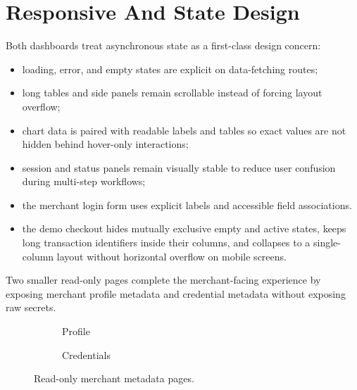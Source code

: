 \section{Responsive And State Design}

Both dashboards treat asynchronous state as a first-class design concern:

\begin{itemize}
  \item loading, error, and empty states are explicit on data-fetching routes;
  \item long tables and side panels remain scrollable instead of forcing layout
  overflow;
  \item chart data is paired with readable labels and tables so exact values are
  not hidden behind hover-only interactions;
  \item session and status panels remain visually stable to reduce user
  confusion during multi-step workflows;
  \item the merchant login form uses explicit labels and accessible field
  associations.
  \item the demo checkout hides mutually exclusive empty and active states,
  keeps long transaction identifiers inside their columns, and collapses to a
  single-column layout without horizontal overflow on mobile screens.
\end{itemize}

Two smaller read-only pages complete the merchant-facing experience by exposing
merchant profile metadata and credential metadata without exposing raw secrets.

\begin{figure}[!htbp]
\centering
\begin{subfigure}{0.48\textwidth}
  \centering
  \caption{Profile}
\end{subfigure}
\hfill
\begin{subfigure}{0.48\textwidth}
  \centering
  \caption{Credentials}
\end{subfigure}
\caption{Read-only merchant metadata pages.}
\end{figure}
